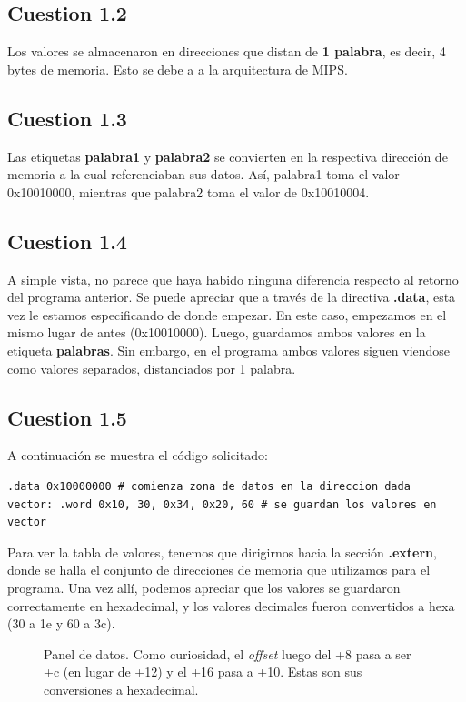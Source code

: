 \documentclass[11pt]{article}
\begin{document}
\begin{large}
\begin{flushleft}
\subsection*{Cuestion 1.2}
Los valores se almacenaron en direcciones que distan de \textbf{1 palabra}, es decir, 4 bytes de memoria. Esto se debe a a la arquitectura de MIPS.

\subsection*{Cuestion 1.3}
Las etiquetas \textbf{palabra1} y \textbf{palabra2} se convierten en la respectiva dirección de memoria a la cual referenciaban sus datos. Así, palabra1 toma el valor 0x10010000, mientras que palabra2 toma el valor de 0x10010004.


\subsection*{Cuestion 1.4}
A simple vista, no parece que haya habido ninguna diferencia respecto al retorno del programa anterior. Se puede apreciar que a través de la directiva \textbf{.data}, esta vez le estamos especificando de donde empezar. En este caso, empezamos en el mismo lugar de antes (0x10010000). Luego, guardamos ambos valores en la etiqueta \textbf{palabras}. Sin embargo, en el programa ambos valores siguen viendose como valores separados, distanciados por 1 palabra.

\subsection*{Cuestion 1.5}
A continuación se muestra el código solicitado:
\begin{listing}[h]
\begin{verbatim}
.data 0x10000000 # comienza zona de datos en la direccion dada
vector: .word 0x10, 30, 0x34, 0x20, 60 # se guardan los valores en vector
\end{verbatim}
\end{listing}

Para ver la tabla de valores, tenemos que dirigirnos hacia la sección \textbf{.extern}, donde se halla el conjunto de direcciones de memoria que utilizamos para el programa. Una vez allí, podemos apreciar que los valores se guardaron correctamente en hexadecimal, y los valores decimales fueron convertidos a hexa (30 a 1e y 60 a 3c).

\begin{figure}[H]
    \centering
    \caption{Panel de datos. Como curiosidad, el \textit{offset} luego del +8 pasa a ser +c (en lugar de +12) y el +16 pasa a +10. Estas son sus conversiones a hexadecimal.}
    \label{fig:my_label}
\end{figure}





\end{flushleft}
\end{large}
\end{document}
